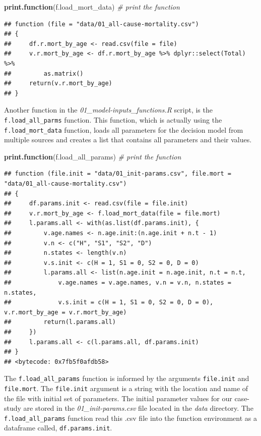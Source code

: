 \documentclass[]{article}
\newenvironment{Shaded}{\begin{snugshade}}{\end{snugshade}}
\newcommand{\KeywordTok}[1]{\textcolor[rgb]{0.13,0.29,0.53}{\textbf{#1}}}
\newcommand{\CommentTok}[1]{\textcolor[rgb]{0.56,0.35,0.01}{\textit{#1}}}
\newcommand{\NormalTok}[1]{#1}
\begin{document}
\begin{Shaded}
\begin{Highlighting}[]
\KeywordTok{print.function}\NormalTok{(f.load_mort_data) }\CommentTok{# print the function}
\end{Highlighting}
\end{Shaded}

\begin{verbatim}
## function (file = "data/01_all-cause-mortality.csv") 
## {
##     df.r.mort_by_age <- read.csv(file = file)
##     v.r.mort_by_age <- df.r.mort_by_age %>% dplyr::select(Total) %>% 
##         as.matrix()
##     return(v.r.mort_by_age)
## }
\end{verbatim}

Another function in the \emph{01\_model-inputs\_functions.R} script, is
the \texttt{f.load\_all\_parms} function. This function, which is
actually using the \texttt{f.load\_mort\_data} function, loads all
parameters for the decision model from multiple sources and creates a
list that contains all parameters and their values.

\begin{Shaded}
\begin{Highlighting}[]
\KeywordTok{print.function}\NormalTok{(f.load_all_params)  }\CommentTok{# print the function}
\end{Highlighting}
\end{Shaded}

\begin{verbatim}
## function (file.init = "data/01_init-params.csv", file.mort = "data/01_all-cause-mortality.csv") 
## {
##     df.params.init <- read.csv(file = file.init)
##     v.r.mort_by_age <- f.load_mort_data(file = file.mort)
##     l.params.all <- with(as.list(df.params.init), {
##         v.age.names <- n.age.init:(n.age.init + n.t - 1)
##         v.n <- c("H", "S1", "S2", "D")
##         n.states <- length(v.n)
##         v.s.init <- c(H = 1, S1 = 0, S2 = 0, D = 0)
##         l.params.all <- list(n.age.init = n.age.init, n.t = n.t, 
##             v.age.names = v.age.names, v.n = v.n, n.states = n.states, 
##             v.s.init = c(H = 1, S1 = 0, S2 = 0, D = 0), v.r.mort_by_age = v.r.mort_by_age)
##         return(l.params.all)
##     })
##     l.params.all <- c(l.params.all, df.params.init)
## }
## <bytecode: 0x7fb5f0afdb58>
\end{verbatim}

The \texttt{f.load\_all\_params} function is informed by the arguments
\texttt{file.init} and \texttt{file.mort}. The \texttt{file.init}
argument is a string with the location and name of the file with initial
set of parameters. The initial parameter values for our case-study are
stored in the \emph{01\_init-params.csv} file located in the \emph{data}
directory. The \texttt{f.load\_all\_params} function read this .csv file
into the function environment as a dataframe called,
\texttt{df.params.init}.
\end{document}

